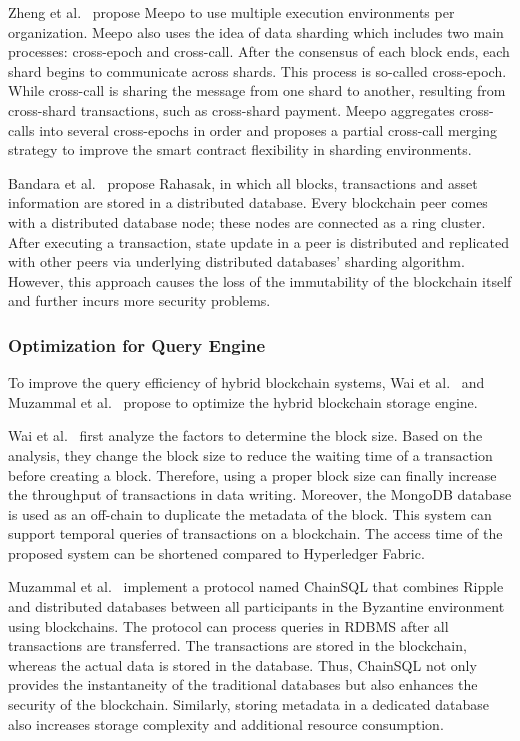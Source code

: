 \documentclass[acmsmall]{acmart}
\begin{document}
Zheng et al.~\cite{DBLP:conf/icde/ZhengXZZYZ21} propose Meepo to use multiple execution environments per organization. Meepo also uses the idea of data sharding which includes two main processes: cross-epoch and cross-call. After the consensus of each block ends, each shard begins to communicate across shards. This process is so-called cross-epoch. While cross-call is sharing the message from one shard to another, resulting from cross-shard transactions, such as cross-shard payment. Meepo aggregates cross-calls into several cross-epochs in order and proposes a partial cross-call merging strategy to improve the smart contract flexibility in sharding environments. 



Bandara et al.~\cite{DBLP:journals/jsa/BandaraLFSRZ21} propose Rahasak, in which all blocks, transactions and asset information are stored in a distributed database. Every blockchain peer comes with a distributed database node; these nodes are connected as a ring cluster. After executing a transaction, state update in a peer is distributed and replicated with other peers via underlying distributed databases’ sharding algorithm. However, this approach causes the loss of the immutability of the blockchain itself and further incurs more security problems.


\subsubsection{Optimization for Query Engine}
To improve the query efficiency of hybrid blockchain systems, Wai et al.~\cite{wai2019storage}  and Muzammal et al.~\cite{muzammal2018blockchain} propose to optimize the hybrid blockchain storage engine. 

 Wai et al.~\cite{wai2019storage}  first analyze the factors to determine the block size. Based on the analysis, they change the block size to reduce the waiting time of a transaction before creating a block. Therefore, using a proper block size can finally increase the throughput of transactions in data writing. Moreover, the MongoDB database is used as an off-chain to duplicate the metadata of the block. This system can support temporal queries of transactions on a blockchain. The access time of the proposed system can be shortened compared to Hyperledger Fabric.

Muzammal et al.~\cite{muzammal2018blockchain} implement a protocol named ChainSQL that combines Ripple and distributed databases between all participants in the Byzantine environment using blockchains. The protocol can process queries in RDBMS after all transactions are transferred. The transactions are stored in the blockchain, whereas the actual data is stored in the database. Thus, ChainSQL not only provides the instantaneity of the traditional databases but also enhances the security of the blockchain.
Similarly, storing metadata in a dedicated database also increases storage complexity and additional resource consumption.
\end{document}
